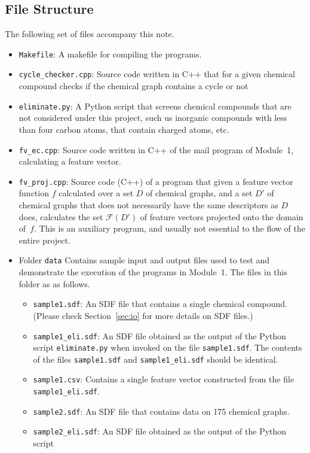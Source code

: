 \documentclass[11pt,titlepage,dvipdfmx,twoside]{book}
\newcommand{\secref}[1]{Section~\ref{sec:#1}}
\begin{document}
\subsection{File Structure}
The following set of files accompany this note.
\begin{itemize}
\item {\tt Makefile}: 
A makefile for compiling the programs. 
%
\item {\tt cycle\_checker.cpp}: 
Source code written in C++ that for a given chemical compound checks if 
the chemical graph contains a cycle or not
\item {\tt eliminate.py}: 
A Python script that screens chemical compounds that are not
considered under this project, such us inorganic
compounds with less than four carbon atoms, 
that contain charged atoms, etc.
%
\item {\tt fv\_ec.cpp}: 
Source code written in C++ 
of the mail program of Module~1,
calculating a feature vector.
%
\item {\tt fv\_proj.cpp}: 
Source code (C++) of a program
that given a feature vector function $f$
calculated over a set $D$ of chemical graphs,
and a set $D'$ of chemical graphs that does not necessarily have the same
descriptors as $D$ does, 
calculates the set ${\mathcal F}(D')$ of feature vectors
projected onto the domain of~$f$.
This is an auxiliary program, 
and usually not essential to the flow of the entire project.
%
\item Folder {\tt data} 
Contains sample input and output files
used to test and demonstrate the execution of the
programs in Module~1.
The files in this folder as as follows.
%
\begin{itemize}
  \item {\tt sample1.sdf}: 
  An SDF file that contains a single chemical compound.
  (Please check \secref{io} for more details on SDF files.)
  \item {\tt sample1\_eli.sdf}: 
  An SDF file obtained as the output of the Python script 
  {\tt eliminate.py} when invoked on the file {\tt sample1.sdf}.
  The contents of the files {\tt sample1.sdf} and {\tt sample1\_eli.sdf}
  should be identical.
  \item {\tt sample1.csv}: 
  Contains a single feature vector
  constructed from the file
  {\tt sample1\_eli.sdf}.
  \item {\tt sample2.sdf}: 
  An SDF file that contains data on 175 chemical graphs.
%
  \item {\tt sample2\_eli.sdf}: 
    An SDF file obtained as the output of the Python script 

\end{itemize}
\end{itemize}
\end{document}

